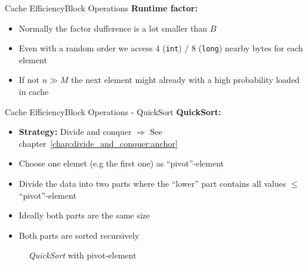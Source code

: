 
\begin{frame}{Cache Efficiency}{Block Operations}
  \textbf{Runtime factor:}
  \begin{itemize}
    \item
      Normally the factor dufference is a lot smaller than
      {\color{Mittel-Blau}$B$}
    \item
      Even with a {\color{Mittel-Blau}random order} we access 4 (\texttt{int}) /
      8 (\texttt{long}) nearby bytes for each element
    \item
      If {\color{Mittel-Blau}not $n \gg M$} the next element might already
      with a high probability loaded in cache
  \end{itemize}
\end{frame}


\begin{frame}{Cache Efficiency}{Block Operations - QuickSort}
  \textbf{QuickSort:}\\
  \begin{itemize}
    \item
      \textbf{Strategy:} Divide and conquer
      $\Rightarrow$ See chapter~\ref{chap:divide_and_conquer:anchor}
      \item
        Choose one elemet (e.g the first one) as
        {\color{Mittel-Blau}\enquote{pivot}-element}
      \item
        Divide the data into two parts where the \enquote{lower} part contains
        all values {\color{Mittel-Blau}$\leq$ \enquote{pivot}-element}
      \item
        Ideally both parts are the same size
      \item
        Both parts are sorted recursively
  \end{itemize}
  \vspace{-1em}
  \begin{figure}%
    \begin{adjustbox}{width=\linewidth}%
    \end{adjustbox}%
    \caption{\textit{QuickSort} with pivot-element}
    \label{fig:caching:quicksort_pivot}
  \end{figure}%
\end{frame}

